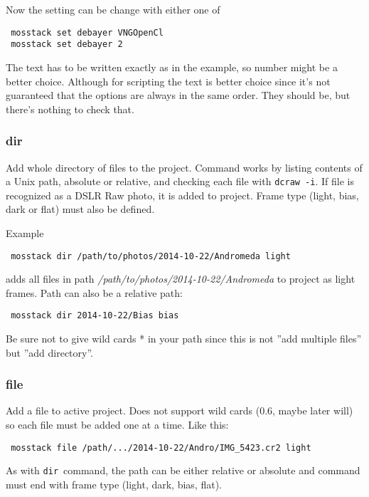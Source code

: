 \documentclass[twoside,a4paper]{refart}
\begin{document}
Now the setting can be change with either one of

\begin{verbatim}
 mosstack set debayer VNGOpenCl
 mosstack set debayer 2
\end{verbatim}

The text has to be written exactly as in the example, so number might be a better choice. Although for scripting the
text is better choice since it's not guaranteed that the options are always in the same order. They should be, but
there's nothing to check that.

\subsubsection{dir}
Add whole directory of files to the project. Command works by listing contents of a Unix path, absolute or relative,
and checking each file with \texttt{dcraw -i}. If file is recognized as a DSLR Raw photo, it is added to project. Frame
type (light, bias, dark or flat) must also be defined.

Example

\begin{verbatim}
 mosstack dir /path/to/photos/2014-10-22/Andromeda light
\end{verbatim}

adds all files in path \textit{/path/to/photos/2014-10-22/Andromeda} to project as light frames. Path can also be
a relative path:

\begin{verbatim}
 mosstack dir 2014-10-22/Bias bias
\end{verbatim}

Be sure not to give wild cards * in your path since this is not ''add multiple files'' but ''add directory''.


\subsubsection{file}
Add a file to active project. Does not support wild cards (0.6, maybe later will) so each file must be added one at
a time. Like this:

\begin{verbatim}
 mosstack file /path/.../2014-10-22/Andro/IMG_5423.cr2 light
\end{verbatim}

As with \texttt{dir} command, the path can be either relative or absolute and command must end with frame type (light,
dark, bias, flat).
\end{document}
